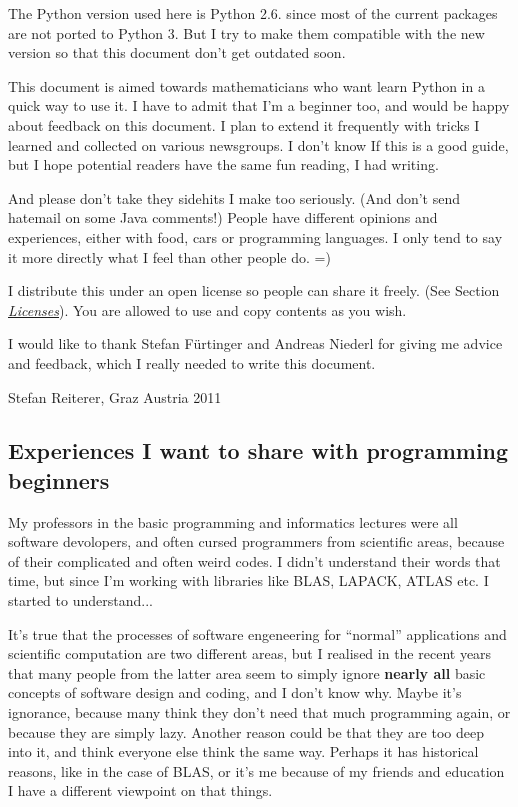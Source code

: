 \documentclass[letterpaper,10pt,english]{manual}
\begin{document}
The Python version used here is Python 2.6. since most of the current packages are not ported to Python 3.
But I try to make them compatible with the new version so that this document don't get outdated soon.

This document is aimed towards mathematicians who want learn Python in a quick way to use it.
I have to admit that I'm a beginner too, and would be happy about
feedback on this document. I plan to extend it frequently with tricks
I learned and collected on various newsgroups. I don't know If this is
a good guide, but I hope potential readers have the same fun reading,
I had writing.

And please don't take they sidehits I make too seriously.  (And don't send hatemail on some Java comments!)
People have different opinions and experiences, either with food, cars or programming languages. I only tend to say it more
directly what I feel than other people do. =)

I distribute this under an open license so people can share it
freely. (See Section \hyperlink{license-ref}{\emph{Licenses}}). You are allowed to use and
copy contents as you wish.

I would like to thank Stefan Fürtinger and Andreas Niederl for giving
me advice and feedback, which I really needed to write this document.

Stefan Reiterer,
Graz Austria
2011


\subsection{Experiences I want to share with programming beginners}

My professors in the basic programming and informatics lectures were all software devolopers, and often cursed programmers from scientific areas,
because of their complicated and often weird codes. I didn't understand their words that time, but since I'm working with libraries like
BLAS, LAPACK, ATLAS etc. I started to understand...

It's true that the processes of software engeneering for ``normal'' applications and scientific computation are two different areas, but I realised in the recent
years that many people from the latter area seem to simply ignore \textbf{nearly all} basic concepts of software design and coding, and I don't know why.
Maybe it's ignorance, because many think they don't need that much programming again, or because they are simply lazy. Another reason could be
that they are too deep into it, and think everyone else think the same way. Perhaps it has historical reasons, like in the case of BLAS,
or it's me because of my friends and education I have a different viewpoint on  that things.
\end{document}
